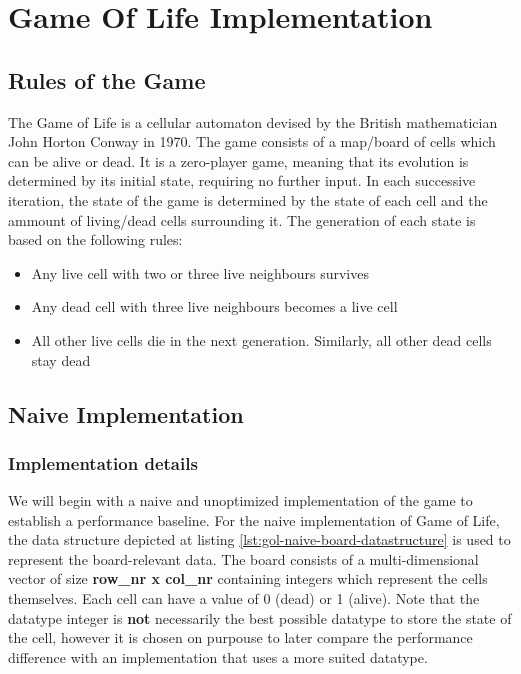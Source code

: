 \documentclass[a4paper,english,12pt,twoside=false]{scrartcl} %
\begin{document}
\section{Game Of Life Implementation}

\subsection{Rules of the Game}

The Game of Life is a cellular automaton devised by the British mathematician John Horton Conway in 1970. The game consists of a map/board of cells which can be alive or dead. It is a zero-player game, meaning that its evolution is determined by its initial state, requiring no further input. In each successive iteration, the state of the game is determined by the state of each cell and the ammount of living/dead cells surrounding it. The generation of each state is based on the following rules:

\begin{itemize}
	\item{Any live cell with two or three live neighbours survives}
	\item{Any dead cell with three live neighbours becomes a live cell}
	\item{All other live cells die in the next generation. Similarly, all other dead cells stay dead}
\end{itemize}

\subsection{Naive Implementation}

\subsubsection{Implementation details}

We will begin with a naive and unoptimized implementation of the game to establish a performance baseline. For the naive implementation of Game of Life, the data structure depicted at listing \ref{lst:gol-naive-board-datastructure} is used to represent the board-relevant data. The board consists of a multi-dimensional vector of size \textbf{row{\_}nr x col{\_}nr}  containing integers which represent the cells themselves. Each cell can have a value of 0 (dead) or 1 (alive). Note that the datatype integer is \textbf{not} necessarily the best possible datatype to store the state of the cell, however it is chosen on purpouse to later compare the performance difference with an implementation that uses a more suited datatype.
\end{document}
